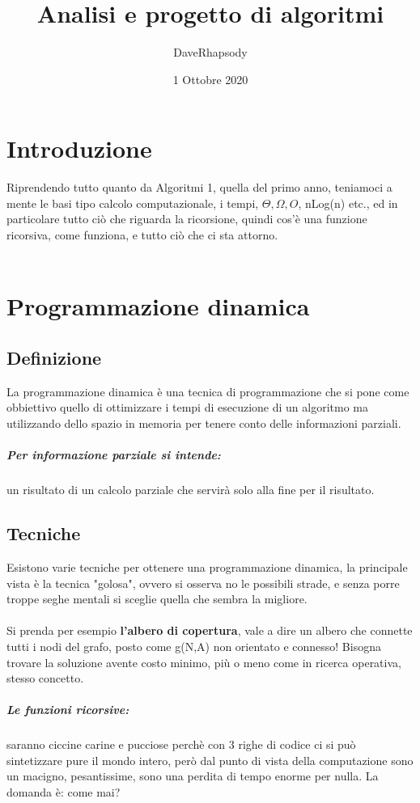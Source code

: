 \documentclass[12pt, a4paper, openany, twoside]{book}
\begin{document}
\selectfont
\pagestyle{plain}
\author{DaveRhapsody}
\title {Analisi e progetto di algoritmi}
\date {1 Ottobre 2020}
\maketitle
\tableofcontents
\chapter{Introduzione}
Riprendendo tutto quanto da Algoritmi 1, quella del primo anno, teniamoci a mente
le basi tipo calcolo computazionale, i tempi, $\Theta, \Omega, O$, nLog(n) etc.,
ed in particolare tutto ciò che riguarda la ricorsione, quindi cos'è una funzione
ricorsiva, come funziona, e tutto ciò che ci sta attorno. \\ \\
\chapter{Programmazione dinamica}
\section{Definizione}
La programmazione dinamica è una tecnica di programmazione che si pone come
obbiettivo quello di ottimizzare i tempi di esecuzione di un algoritmo ma
utilizzando dello spazio in memoria per tenere conto delle informazioni parziali.
\paragraph{Per informazione parziale si intende:} un risultato di un calcolo
parziale che servirà solo alla fine per il risultato.
\section{Tecniche}
Esistono varie tecniche per ottenere una programmazione dinamica, la principale
vista è la tecnica "golosa", ovvero si osserva no le possibili strade, e senza
porre troppe seghe mentali si sceglie quella che sembra la migliore.\\ \\
Si prenda per esempio \textbf{l'albero di copertura}, vale a dire un albero che
connette tutti i nodi del grafo, posto come g(N,A) non orientato e connesso!
Bisogna trovare la soluzione avente costo minimo, più o meno come in ricerca 
operativa, stesso concetto.
\paragraph{Le funzioni ricorsive: }saranno ciccine carine e pucciose perchè con
3 righe di codice ci si può sintetizzare pure il mondo intero, però dal punto
di vista della computazione sono un macigno, pesantissime, sono una perdita di
tempo enorme per nulla. La domanda è: come mai?
\end{document}
